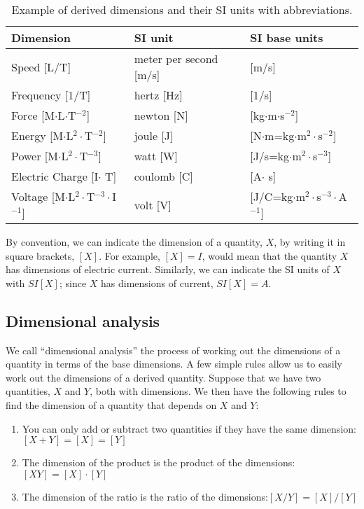 \begin{table}[!h]
\centering
\begin{tabular}{lll }  
\textbf{Dimension}&\textbf{SI unit}&\textbf{SI base units}\\
\hline
\hline
Speed [L/T]& meter per second [m/s] & [m/s]\\ \hline
Frequency [1/T]& hertz [Hz] & [1/s]\\ \hline
Force [M$\cdot$L$\cdot$T$^{-2}$]& newton [N]&[kg$\cdot$m$\cdot$s$^{-2}$]\\ \hline
Energy [M$\cdot$L$^2\cdot$T$^{-2}$]& joule [J]&[N$\cdot$m=kg$\cdot$m$^2\cdot$s$^{-2}$] \\ \hline
Power [M$\cdot$L$^2\cdot$T$^{-3}$]& watt [W]&[J/s=kg$\cdot$m$^2\cdot$s$^{-3}$]\\ \hline
Electric Charge [I$\cdot$ T]& coulomb [C]&[A$\cdot$ s] \\ \hline
Voltage [M$\cdot$L$^2\cdot$T$^{-3}\cdot$I$^{-1}$]& volt [V]&[J/C=kg$\cdot$m$^2\cdot$s$^{-3}\cdot$A$^{-1}$] \\ \hline
\end{tabular}
\caption{\label{tab:chap2:DerivedSIunits} Example of derived dimensions and their SI units with abbreviations.}
\end{table}

By convention, we can indicate the dimension of a quantity, $X$, by writing it in square brackets, $[X]$. For example, $[X]=I$, would mean that the quantity $X$ has dimensions of electric current. Similarly, we can indicate the SI units of $X$ with $SI[X]$; since $X$ has dimensions of current, $SI[X]=A$.

\subsection{Dimensional analysis}
We call ``dimensional analysis'' the process of working out the dimensions of a quantity in terms of the base dimensions. A few simple rules allow us to easily work out the dimensions of a derived quantity. Suppose that we have two quantities, $X$ and $Y$, both with dimensions. We then have the following rules to find the dimension of a quantity that depends on $X$ and $Y$:
\begin{enumerate}
\item You can only add or subtract two quantities if they have the same dimension: $[X+Y]=[X]=[Y]$
\item The dimension of the product is the product of the dimensions: $[XY]=[X]\cdot[Y]$
\item The dimension of the ratio is the ratio of the dimensions:$[X/Y]=[X]/[Y]$
\end{enumerate}

